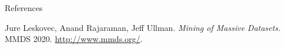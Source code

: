 \begin{frame}[allowframebreaks]{References}
\begin{thebibliography}{99}

Jure Leskovec, Anand Rajaraman, Jeff Ullman. \emph{Mining of Massive Datasets.} MMDS 2020. \href{http://www.mmds.org/}{http://www.mmds.org/}.

\end{thebibliography}
\end{frame}
